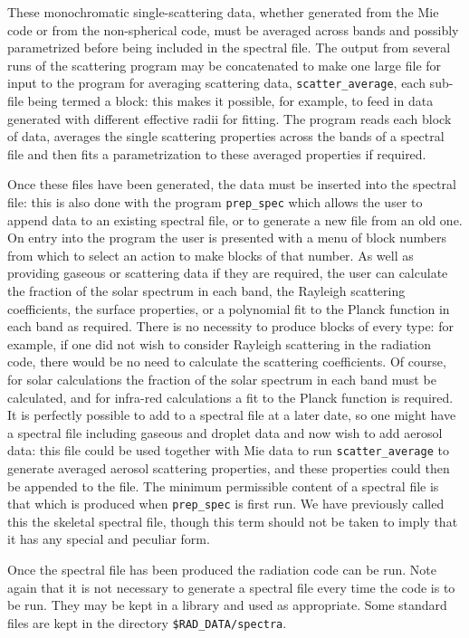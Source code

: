 These monochromatic single-scattering data, whether generated from the Mie
code or from the non-spherical code, must be averaged across bands and
possibly parametrized before being included in the spectral file. The
output from several runs of the scattering program may be concatenated to
make one large file for input to the program for averaging scattering data,
{\tt scatter\_average},
each sub-file being termed a block: this makes it possible, for example, to
feed in data generated with different effective radii for fitting. The 
program reads each block of data, averages the single scattering properties
across the bands of a spectral file and then fits a parametrization to these
averaged properties if required.

Once these files have been generated, the data must be inserted into the
spectral file: this is also done with the program {\tt prep\_spec} which allows
the user to append data to an existing spectral file, or to generate a new
file from an old one. On entry into the program the user is presented with
a menu of block numbers from which to select an action to make blocks of
that number. As well as providing gaseous or scattering data if they are 
required, the user can calculate the fraction of
the solar spectrum in each band, the Rayleigh scattering coefficients, the
surface properties, or a polynomial fit to the Planck function in each
band as required. There is no necessity to produce blocks of every type:
for example, if one did not wish to consider Rayleigh scattering in the
radiation code, there would be no need to calculate the scattering
coefficients. Of course, for solar calculations the fraction of the solar
spectrum in each band must be calculated, and for infra-red calculations a
fit to the Planck function is required. It is perfectly possible to add to
a spectral file at a later date, so one might have a spectral file including
gaseous and droplet data and now wish to add aerosol data: this file could
be used together with Mie data to run {\tt scatter\_average} to generate
averaged aerosol scattering properties, and these properties could then be
appended to the file. The minimum permissible content of a spectral file is
that which is produced when {\tt prep\_spec} is first run. We have previously
called this the skeletal spectral file, though this term should not be taken to
imply that it has any special and peculiar form.

Once the spectral file has been produced the radiation code can be run.
Note again that it is not necessary to generate a spectral file every time
the code is to be run. They may be kept in a library and used as appropriate.
Some standard files are kept in the directory {\tt \$RAD\_DATA/spectra}.

